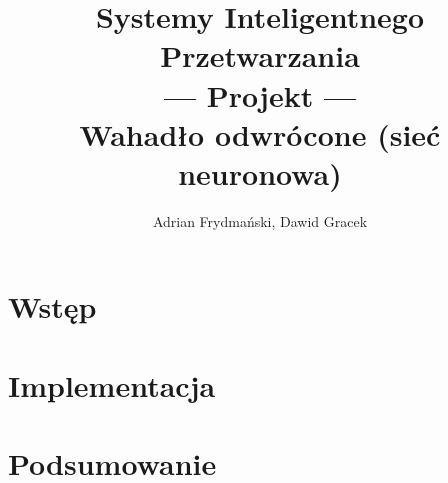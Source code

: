 \documentclass[10pt,a4paper,titlepage]{article}
\author{Adrian Frydmański, Dawid Gracek}
\title{Systemy Inteligentnego Przetwarzania\\--- Projekt ---\\Wahadło odwrócone (sieć neuronowa)}
\begin{document}
	\maketitle
	\clearpage
	\section{Wstęp}
	\section{Implementacja}	
	\section{Podsumowanie}
\end{document}

